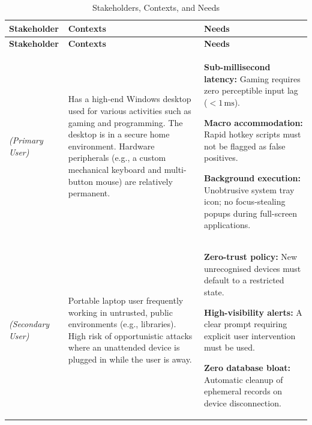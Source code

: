{\small
	\renewcommand{\arraystretch}{1.25}
	\begin{xltabular}{\textwidth}{@{} P{2.5cm} L L @{}}
		\caption{Stakeholders, Contexts, and Needs} \label{tab:stakeholder_matrix} \\
		\toprule
		\textbf{Stakeholder} & \textbf{Contexts} & \textbf{Needs} \\
		\midrule
		\endfirsthead

		\toprule
		\textbf{Stakeholder} & \textbf{Contexts} & \textbf{Needs} \\
		\midrule
		\endhead


		\textbf{\stakeholdersPU}\par
		\textit{\footnotesize (Primary User)} &
		Has a high-end Windows desktop used for various activities such as gaming and programming. The desktop is in a secure home environment. Hardware peripherals (e.g., a custom mechanical keyboard and multi-button mouse) are relatively permanent. &
		\begin{tablelist}
			\item \textbf{Sub-millisecond latency:} Gaming requires zero perceptible input lag ($<1\,\text{ms}$).
			\item \textbf{Macro accommodation:} Rapid hotkey scripts must not be flagged as false positives.
			\item \textbf{Background execution:} Unobtrusive system tray icon; no focus-stealing popups during full-screen applications.
		\end{tablelist} \\

		\textbf{\stakeholdersSU}\par
		\textit{\footnotesize (Secondary User)} &
		Portable laptop user frequently working in untrusted, public environments (e.g., libraries). High risk of opportunistic attacks where an unattended device is plugged in while the user is away. &
		\begin{tablelist}
			\item \textbf{Zero-trust policy:} New unrecognised devices must default to a restricted state.
			\item \textbf{High-visibility alerts:} A clear prompt requiring explicit user intervention must be used.
			\item \textbf{Zero database bloat:} Automatic cleanup of ephemeral records on device disconnection.
		\end{tablelist} \\


\end{xltabular}}
